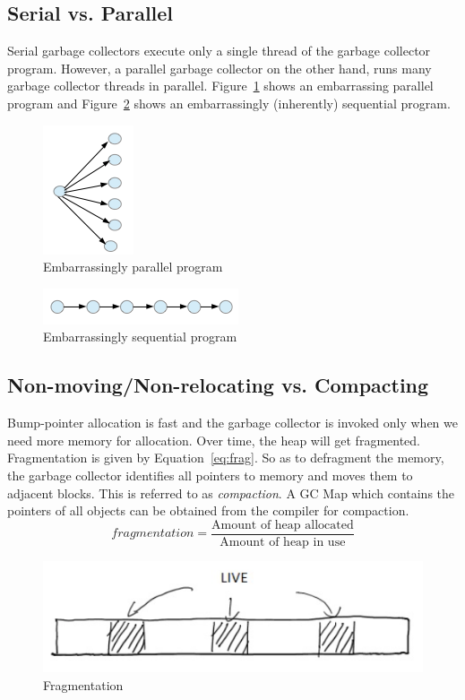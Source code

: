 \documentclass[twoside]{article}
\begin{document}
\subsection{Serial vs. Parallel}
Serial garbage collectors execute only a single thread of the garbage collector program. However, a parallel garbage collector on the other hand, runs many garbage collector threads in parallel. Figure~\ref{fig:parallel} shows an embarrassing parallel program and Figure~\ref{fig:serial} shows an embarrassingly (inherently) sequential program. \\
\begin{figure}[h]
\centering
\includegraphics{embarrassinglyParallel.png}
\caption{Embarrassingly parallel program\label{fig:parallel}}
\end{figure}
\begin{figure}[h]
\centering
\includegraphics{embarrassinglySequential.png}
\caption{Embarrassingly sequential program\label{fig:serial}}
\end{figure}
\subsection{Non-moving/Non-relocating vs. Compacting}
Bump-pointer allocation is fast and the garbage collector is invoked only when we need more memory for allocation. Over time, the heap will get fragmented. Fragmentation is given by Equation~\ref{eq:frag}. So as to defragment the memory, the garbage collector identifies all pointers to memory and moves them to adjacent blocks. This is referred to as \textit{compaction}. A GC Map which contains the pointers of all objects can be obtained from the compiler for compaction.
\begin{equation}\label{eq:frag}
fragmentation = \frac{\text{Amount of heap allocated}}{\text{Amount of heap in use}}
\end{equation}
\begin{figure}[h]
\centering
\includegraphics[scale=0.5]{fragmentation}
\caption{Fragmentation \label{fig:fragmentation}}
\end{figure}
\end{document}

